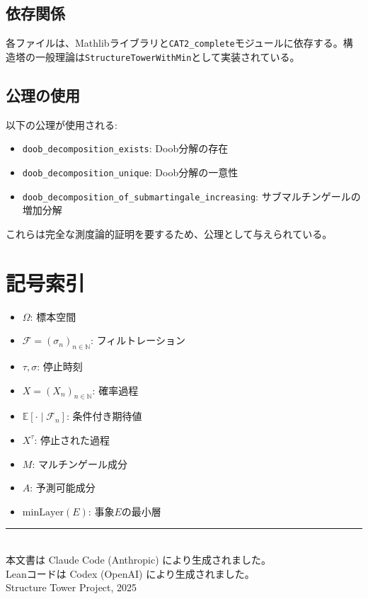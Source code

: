 \documentclass[a4paper,12pt]{ltjsarticle}
\theoremstyle{definition}
\begin{document}
\subsection{依存関係}

各ファイルは、Mathlibライブラリと\texttt{CAT2\_complete}モジュールに依存する。構造塔の一般理論は\texttt{StructureTowerWithMin}として実装されている。

\subsection{公理の使用}

以下の公理が使用される:
\begin{itemize}
  \item \texttt{doob\_decomposition\_exists}: Doob分解の存在
  \item \texttt{doob\_decomposition\_unique}: Doob分解の一意性
  \item \texttt{doob\_decomposition\_of\_submartingale\_increasing}: サブマルチンゲールの増加分解
\end{itemize}

これらは完全な測度論的証明を要するため、公理として与えられている。

\section{記号索引}

\begin{itemize}
  \item $\Omega$: 標本空間
  \item $\mathcal{F} = (\sigma_n)_{n \in \mathbb{N}}$: フィルトレーション
  \item $\tau, \sigma$: 停止時刻
  \item $X = (X_n)_{n \in \mathbb{N}}$: 確率過程
  \item $\mathbb{E}[\cdot \mid \mathcal{F}_n]$: 条件付き期待値
  \item $X^\tau$: 停止された過程
  \item $M$: マルチンゲール成分
  \item $A$: 予測可能成分
  \item $\mathrm{minLayer}(E)$: 事象$E$の最小層
\end{itemize}

\vfill

\begin{center}
\rule{0.5\textwidth}{0.4pt}\\[1em]
本文書は Claude Code (Anthropic) により生成されました。\\
Leanコードは Codex (OpenAI) により生成されました。\\[0.5em]
Structure Tower Project, 2025
\end{center}
\end{document}
